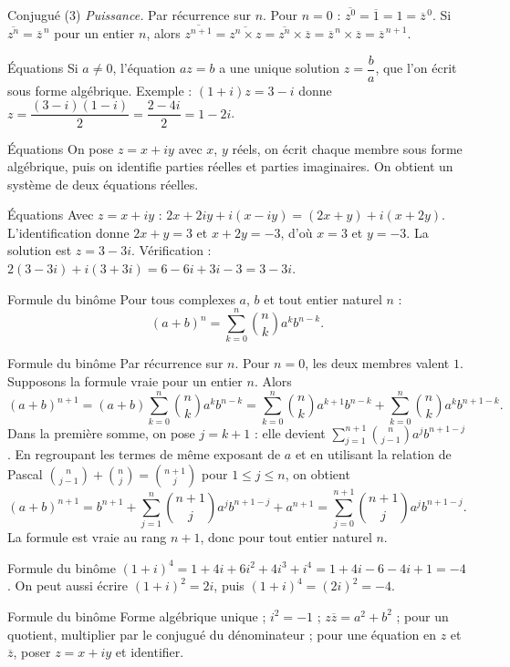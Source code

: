 \documentclass[aspectratio=169,10pt]{beamer}
\begin{document}
\begin{frame}{Conjugué (3)}
\emph{Puissance.} Par récurrence sur \(n\). Pour \(n=0\) : \(\overline{z^0}=\overline1=1=\overline z^{\,0}\). Si \(\overline{z^n}=\overline z^{\,n}\) pour un entier \(n\), alors \(\overline{z^{n+1}}=\overline{z^n\times z}=\overline{z^n}\times\overline z=\overline z^{\,n}\times\overline z=\overline z^{\,n+1}\).
\end{frame}
\begin{frame}{Équations}
Si \(a\neq0\), l'équation \(az=b\) a une unique solution \(z=\dfrac ba\), que l'on écrit sous forme algébrique. Exemple : \((1+i)z=3-i\) donne \(z=\dfrac{(3-i)(1-i)}{2}=\dfrac{2-4i}{2}=1-2i\).
\end{frame}
\begin{frame}{Équations}
On pose \(z=x+iy\) avec \(x\), \(y\) réels, on écrit chaque membre sous forme algébrique, puis on identifie parties réelles et parties imaginaires. On obtient un système de deux équations réelles.
\end{frame}
\begin{frame}{Équations}
Avec \(z=x+iy\) : \(2x+2iy+i(x-iy)=(2x+y)+i(x+2y)\). L'identification donne \(2x+y=3\) et \(x+2y=-3\), d'où \(x=3\) et \(y=-3\). La solution est \(z=3-3i\). Vérification : \(2(3-3i)+i(3+3i)=6-6i+3i-3=3-3i\).
\end{frame}
\begin{frame}{Formule du binôme}
Pour tous complexes \(a\), \(b\) et tout entier naturel \(n\) :
\[(a+b)^n=\sum_{k=0}^{n}\binom nk a^kb^{n-k}.\]
\end{frame}
\begin{frame}{Formule du binôme}
Par récurrence sur \(n\). Pour \(n=0\), les deux membres valent \(1\). Supposons la formule vraie pour un entier \(n\). Alors
\[(a+b)^{n+1}=(a+b)\sum_{k=0}^{n}\binom nk a^kb^{n-k}=\sum_{k=0}^{n}\binom nk a^{k+1}b^{n-k}+\sum_{k=0}^{n}\binom nk a^kb^{n+1-k}.\]
Dans la première somme, on pose \(j=k+1\) : elle devient \(\sum_{j=1}^{n+1}\binom n{j-1}a^jb^{n+1-j}\). En regroupant les termes de même exposant de \(a\) et en utilisant la relation de Pascal \(\binom n{j-1}+\binom nj=\binom{n+1}j\) pour \(1\le j\le n\), on obtient
\[(a+b)^{n+1}=b^{n+1}+\sum_{j=1}^{n}\binom{n+1}j a^jb^{n+1-j}+a^{n+1}=\sum_{j=0}^{n+1}\binom{n+1}j a^jb^{n+1-j}.\]
La formule est vraie au rang \(n+1\), donc pour tout entier naturel \(n\).
\end{frame}
\begin{frame}{Formule du binôme}
\((1+i)^4=1+4i+6i^2+4i^3+i^4=1+4i-6-4i+1=-4\). On peut aussi écrire \((1+i)^2=2i\), puis \((1+i)^4=(2i)^2=-4\).
\end{frame}
\begin{frame}{Formule du binôme}
Forme algébrique unique ; \(i^2=-1\) ; \(z\overline z=a^2+b^2\) ; pour un quotient, multiplier par le conjugué du dénominateur ; pour une équation en \(z\) et \(\overline z\), poser \(z=x+iy\) et identifier.
\end{frame}
\end{document}
